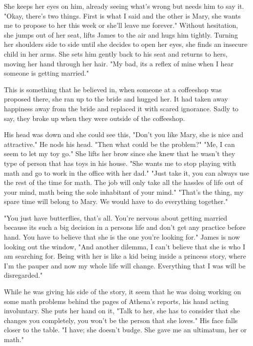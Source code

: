         She keeps her eyes on him, already seeing what's wrong but needs him to say it. "Okay, there's two things. First is what I said and the
    other is Mary, she wants me to propose to her this week or she'll leave me forever." Without hesitation, she jumps out of her seat, lifts
    James to the air and hugs him tightly. Turning her shoulders side to side until she decides to open her eyes, she finds an insecure child
    in her arms. She sets him gently back to his seat and returns to hers, moving her hand through her hair. "My bad, its a reflex of mine when
    I hear someone is getting married."

        This is something that he believed in, when someone at a coffeeshop was proposed there, she ran up to the bride and hugged her. It
    had taken away happiness away from the bride and replaced it with scared ignorance. Sadly to say, they broke up when they were outside of
    the coffeeshop.

        His head was down and she could see this, "Don't you like Mary, she is nice and attractive." He nods his head. "Then what could be the
    problem?" "Me, I can seem to let my toy go." She lifts her brow since she knew that he wasn't they type of person that has toys in his house.
    "She wants me to stop playing with math and go to work in the office with her dad." "Just take it, you can always use the rest of the time
    for math. The job will only take all the hassles of life out of your mind, math being the sole inhabitant of your mind." "That's the thing,
    my spare time will belong to Mary. We would have to do everything together."

        "You just have butterflies, that's all. You're nervous about getting married because its such a big decision in a persons life and don't
    get any practice before hand. You have to believe that she is the one you're looking for." James is now looking out the window, "And another
    dilemma, I can't believe that she is who I am searching for. Being with her is like a kid being inside a princess story, where I'm the
    pauper and now my whole life will change. Everything that I was will be disregarded."

        While he was giving his side of the story, it seem that he was doing working on some math problems behind the pages of Athena's reports,
    his hand acting involuntary. She puts her hand on it, "Talk to her, she has to consider that she changes you completely, you won't be the
    person that she loves." His face falls closer to the table. "I have; she doesn't budge. She gave me an ultimatum, her or math."

